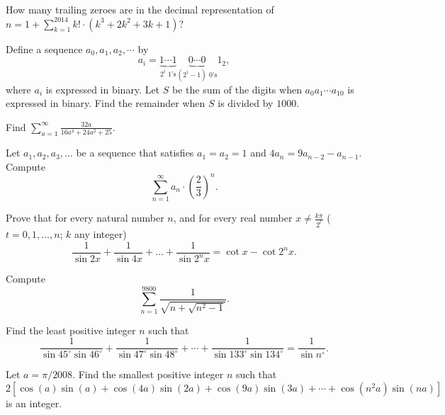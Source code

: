 \documentclass{article}
\begin{document}
\begin{prob}{6}
How many trailing zeroes are in the decimal representation of $n=1+\sum_{k=1}^{2014} k!\cdot (k^3+2k^2+3k+1)$?
\end{prob}

\begin{prob}[CIME I 2020/12]{6}
Define a sequence $a_0,a_1,a_2,\cdots$ by
\[a_i=\underbrace{1\cdots 1}_{2^i \text{ 1's}} \underbrace{0\cdots 0}_{(2^i-1) \text{ 0's}} 1_2,\]
where $a_i$ is expressed in binary. Let $S$ be the sum of the digits when $a_0a_1\cdots a_{10}$ is expressed in binary. Find the remainder when $S$ is divided by $1000.$
\end{prob}

\begin{req}{6}
Find $\sum\limits_{a=1}^{\infty}\frac{32a}{16a^4+24a^2+25}.$
\end{req}

\begin{prob}[NARML 5]{6}
Let $a_1,a_2,a_3,\ldots$ be a sequence that satisfies $a_1=a_2=1$ and $4a_n=9a_{n-2}-a_{n-1}.$ Compute
\[\sum_{n=1}^{\infty}a_n\cdot \left(\frac{2}{3}\right)^n.\]
\end{prob}

\begin{prob}[IMO 1966/4]{6}
Prove that for every natural number $n$, and for every real number $x \neq \frac{k\pi}{2^t}$ ($t=0,1, \dots, n$; $k$ any integer)
\[\frac{1}{\sin{2x}}+\frac{1}{\sin{4x}}+\dots+\frac{1}{\sin{2^nx}}=\cot{x}-\cot{2^nx}.\]
\end{prob}

\begin{prob}{9}
Compute \[\sum_{n = 1}^{9800} \frac{1}{\sqrt{n + \sqrt{n^2 - 1}}}.\]
\end{prob}


\begin{prob}[AIME II 2000/15]{9}
Find the least positive integer $n$ such that
\[\frac 1{\sin 45^\circ\sin 46^\circ}+\frac 1{\sin 47^\circ\sin 48^\circ}+\cdots+\frac 1{\sin 133^\circ\sin 134^\circ}=\frac 1{\sin n^\circ}.\]
\end{prob}

\begin{prob}[AIME II 2008/8]{13}
Let $a = \pi/2008$. Find the smallest positive integer $n$ such that\[2[\cos(a)\sin(a) + \cos(4a)\sin(2a) + \cos(9a)\sin(3a) + \cdots + \cos(n^2a)\sin(na)]\]is an integer.
\end{prob}
\end{document}
